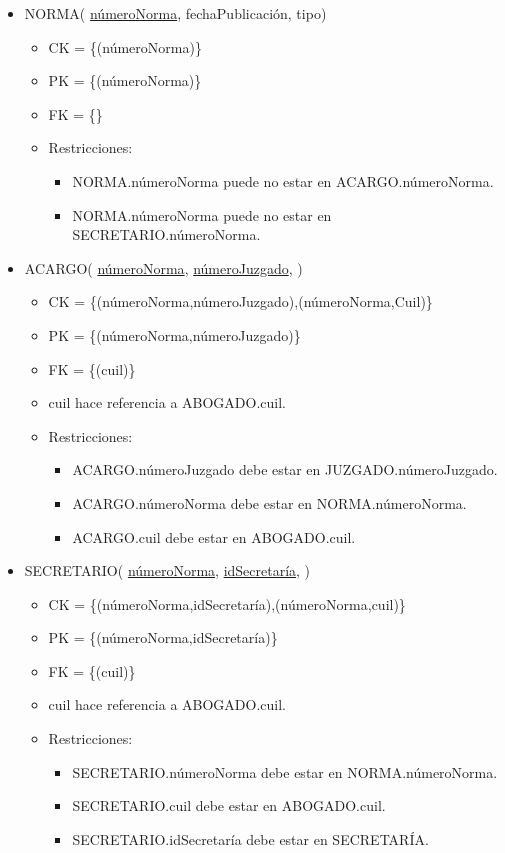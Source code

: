 \begin{itemize}
	
\item NORMA( \underline{númeroNorma}, fechaPublicación, tipo)
	\begin{itemize}
		\item CK = \{(númeroNorma)\}
		\item PK = \{(númeroNorma)\}
		\item FK = \{\}
		\item Restricciones:
			\begin{itemize}
			\item NORMA.númeroNorma puede no estar en ACARGO.númeroNorma.
			\item NORMA.númeroNorma puede no estar en SECRETARIO.númeroNorma.
			\\
			\end{itemize}
	\end{itemize}

	
\item ACARGO(  \underline{númeroNorma}, \underline{númeroJuzgado}, )
	\begin{itemize}
		\item CK = \{(númeroNorma,númeroJuzgado),(númeroNorma,Cuil)\}
		\item PK = \{(númeroNorma,númeroJuzgado)\}
		\item FK = \{(cuil)\}
		\item cuil hace referencia a ABOGADO.cuil.
		\item Restricciones:
			\begin{itemize}
			\item ACARGO.númeroJuzgado debe estar en JUZGADO.númeroJuzgado.
			\item ACARGO.númeroNorma debe estar en NORMA.númeroNorma.
			\item ACARGO.cuil debe estar en ABOGADO.cuil.
			\\
			\end{itemize}
	\end{itemize}
	
	
\item SECRETARIO( \underline{númeroNorma}, \underline{idSecretaría}, )
	\begin{itemize}
		\item CK = \{(númeroNorma,idSecretaría),(númeroNorma,cuil)\}
		\item PK = \{(númeroNorma,idSecretaría)\}
		\item FK = \{(cuil)\}
		\item cuil hace referencia a ABOGADO.cuil.
		\item Restricciones:
			\begin{itemize}
			\item SECRETARIO.númeroNorma debe estar en NORMA.númeroNorma.
			\item SECRETARIO.cuil debe estar en ABOGADO.cuil.
			\item SECRETARIO.idSecretaría debe estar en SECRETARÍA.
			\\
			\end{itemize}
	\end{itemize}



\end{itemize}
